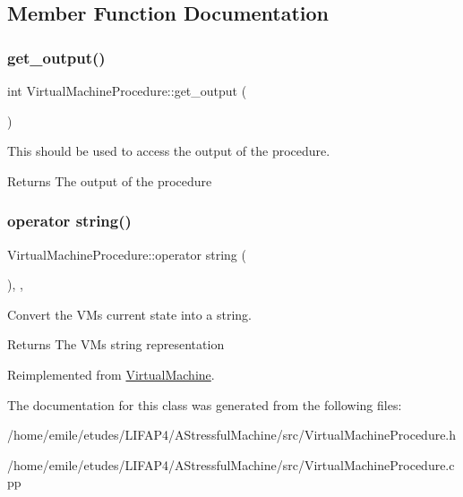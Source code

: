 \subsection{Member Function Documentation}
\mbox{\label{classVirtualMachineProcedure_a608e8e83938e5b29a11c5b26671d3654}} 
\subsubsection{\texorpdfstring{get\+\_\+output()}{get\_output()}}
{\footnotesize\ttfamily int Virtual\+Machine\+Procedure\+::get\+\_\+output (\begin{DoxyParamCaption}{ }\end{DoxyParamCaption})}

This should be used to access the output of the procedure. \begin{DoxyReturn}{Returns}
The output of the procedure 
\end{DoxyReturn}
\mbox{\label{classVirtualMachineProcedure_aea6310148a612586e5fd9e30650decb6}} 
\subsubsection{\texorpdfstring{operator string()}{operator string()}}
{\footnotesize\ttfamily Virtual\+Machine\+Procedure\+::operator string (\begin{DoxyParamCaption}{ }\end{DoxyParamCaption})\hspace{0.3cm}{\ttfamily [explicit]}, {\ttfamily [override]}, {\ttfamily [virtual]}}

Convert the VM\textquotesingle{}s current state into a string. \begin{DoxyReturn}{Returns}
The VM\textquotesingle{}s string representation 
\end{DoxyReturn}


Reimplemented from \hyperlink{classVirtualMachine_ab12bb31d1f511018a0a8e956efb72591}{Virtual\+Machine}.



The documentation for this class was generated from the following files\+:\begin{DoxyCompactItemize}
\item 
/home/emile/etudes/\+L\+I\+F\+A\+P4/\+A\+Stressful\+Machine/src/Virtual\+Machine\+Procedure.\+h\item 
/home/emile/etudes/\+L\+I\+F\+A\+P4/\+A\+Stressful\+Machine/src/Virtual\+Machine\+Procedure.\+cpp\end{DoxyCompactItemize}
